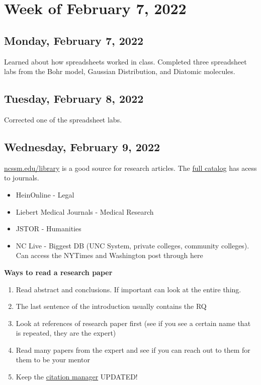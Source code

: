 \documentclass[11pt,letterpaper]{article}
\begin{document}
\section{Week of February 7, 2022}
\subsection{Monday, February 7, 2022}
Learned about how spreadsheets worked in class. Completed three spreadsheet labs from the Bohr model, Gaussian Distribution, and Diatomic molecules. 

\subsection{Tuesday, February 8, 2022}
Corrected one of the spreadsheet labs.

\subsection{Wednesday, February 9, 2022}
\href{https://www.ncssm.edu/library}{ncssm.edu/library} is a good source for research articles. The \href{https://ncssm.follettdestiny.com/common/servlet/presenthomeform.do?l2m=Home&tm=Home&l2m=Home}{full catalog} has acess to journals.

\begin{itemize}
    \item HeinOnline - Legal
    \item Liebert Medical Journals - Medical Research
    \item JSTOR - Humanities
    \item NC Live - Biggest DB (UNC System, private colleges, community colleges). Can access the NYTimes and Washington post through here
\end{itemize}

\textbf{Ways to read a research paper}
\begin{enumerate}
    \item Read abstract and conclusions. If important can look at the entire thing. 
    \item The last sentence of the introduction usually contains the RQ
    \item Look at references of research paper first (see if you see a certain name that is repeated, they are the expert)
    \item Read many papers from the expert and see if you can reach out to them for them to be your mentor
    \item Keep the \href{https://www.mendeley.com/reference-manager/}{citation manager} UPDATED!
\end{enumerate}
\end{document}
